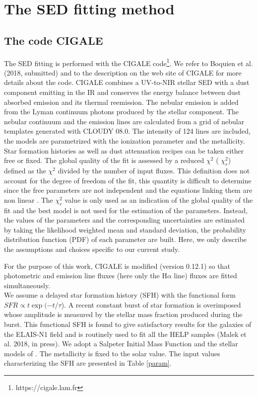 \documentclass{aa}
\begin{document}
\section{The SED fitting method}
\subsection{The code CIGALE}

The SED fitting is performed with the CIGALE code\footnote{https://cigale.lam.fr}. We refer to Boquien et al. (2018, submitted) and to the description on the web site of CIGALE for more details about the code. CIGALE combines a UV-to-NIR stellar SED with a dust component emitting in the IR and conserves the energy balance  between dust absorbed emission and its thermal reemission.  The nebular emission is added  from the  Lyman continuum photons produced by  the stellar component. The nebular continuum and the emission lines are calculated from a grid of nebular templates \citep{Inoue11} generated with CLOUDY 08.0. The intensity of 124 lines are included, the models are parametrized with the ionization parameter and the metallicity. Star formation histories as well as dust attenuation recipes can be taken  either free or fixed. 
The global quality of the fit is assessed by a reduced $\chi^2$ ( $\chi_r^2$) defined as the   $\chi^2$ divided by the number of input fluxes. This definition does not account for the degree of freedom of the fit, this quantity is difficult to determine  since the free parameters are not independent and the equations linking them are non linear \citep{Chevallard16}. The  $\chi_r^2$  value is only used as an indication of the global quality of the fit and the best model is not used for the estimation of the parameters. Instead, the values of the parameters and the corresponding uncertainties are estimated by taking the likelihood weighted mean and standard deviation, the probability distribution function (PDF)  of each parameter are built. Here, we only describe the assumptions and choices specific to our current study.

For the purpose of this work,  CIGALE  is modified  (version 0.12.1) so that  photometric and emission line fluxes (here only the H$\alpha$ line) fluxes  are fitted simultaneously.  \\
We assume a delayed star formation history (SFH) with the functional form $SFR \propto t \exp(-t/\tau$). A recent constant burst of star formation is overimposed whose amplitude is measured by the stellar mass fraction produced during the burst. This functional SFH is found to give satisfactory results for the galaxies of the ELAIS-N1 field  and is routinely used to fit all the HELP samples (Malek et al. 2018, in press). We adopt a Salpeter Initial Mass Function \citep{Salpeter55} and the stellar models of \citet{bc03}. The metallicity is fixed to the solar value. The input values characterizing the SFH are presented in Table \ref{param}.  
\end{document}
